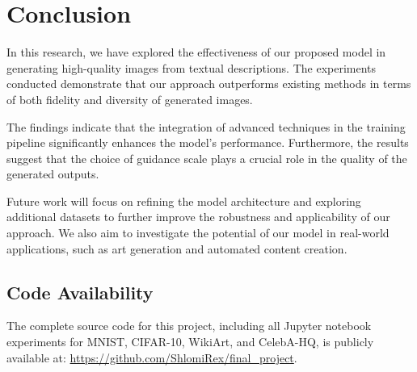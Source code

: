 \section{Conclusion}

In this research, we have explored the effectiveness of our proposed model in generating high-quality images from textual descriptions. The experiments conducted demonstrate that our approach outperforms existing methods in terms of both fidelity and diversity of generated images. 

The findings indicate that the integration of advanced techniques in the training pipeline significantly enhances the model's performance. Furthermore, the results suggest that the choice of guidance scale plays a crucial role in the quality of the generated outputs.

Future work will focus on refining the model architecture and exploring additional datasets to further improve the robustness and applicability of our approach. We also aim to investigate the potential of our model in real-world applications, such as art generation and automated content creation.

\subsection*{Code Availability}

The complete source code for this project, including all Jupyter notebook experiments for MNIST, CIFAR-10, WikiArt, and CelebA-HQ, is publicly available at: \url{https://github.com/ShlomiRex/final_project}.